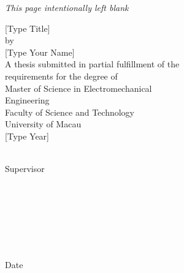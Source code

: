 \thispagestyle{umempty}
\begin{center}
\vspace*{5\baselineskip}
\textit{ \Large This page intentionally left blank}
\end{center}

\begin{titlepage}
\begin{center}
{[Type Title]} \\ [1.5\baselineskip]
{by}\\[1.5\baselineskip]
{[Type Your Name]}\\[1.5\baselineskip]
{A thesis submitted in partial fulfillment of the\\requirements for the degree of } \\[1.5\baselineskip]
{Master of Science in Electromechanical\\Engineering}\\[1.5\baselineskip]
{Faculty of Science and Technology\\University of Macau}\\[1.5\baselineskip]
{[Type Year]} \\[5\baselineskip]
\end{center}
 \underline{\hspace*{\blankofApprovedby} } \\
\hphantom{\hspace{70mm}} {Supervisor} \\
\\
\hphantom{Approved by} \underline{\hspace*{\blankofApprovedby} } \\
\\
\hphantom{Approved by} \underline{\hspace*{\blankofApprovedby} }\\
\\
\hphantom{Approved by} \underline{\hspace*{\blankofApprovedby} }\\
\\
{Date} \underline{\hspace*{\blankofDate} }

\thispagestyle{umempty}
\begin{center}
\vspace*{5\baselineskip}
\textit{  }
\end{center}
\thispagestyle{umempty}


\end{titlepage}
